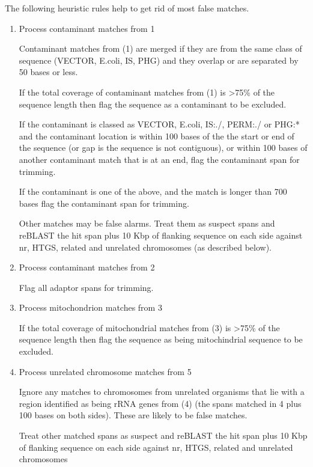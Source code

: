 \documentclass[11pt]{article}
\begin{document}
The following heuristic rules help to get rid of most false matches.

\begin{enumerate}
\item Process contaminant matches from 1
\label{sec:org173af48}


Contaminant matches from (1) are merged if they are from the same class
of sequence (VECTOR, E.coli, IS, PHG) and they overlap or are separated
by 50 bases or less.

If the total coverage of contaminant matches from (1) is >75\% of the
sequence length then flag the sequence as a contaminant to be excluded.

If the contaminant is classed as VECTOR, E.coli, IS:./, PERM:./ or PHG:*
and the contaminant location is within 100 bases of the the start or end
of the sequence (or gap is the sequence is not contiguous), or within
100 bases of another contaminant match that is at an end, flag the
contaminant span for trimming.

If the contaminant is one of the above, and the match is longer than 700
bases flag the contaminant span for trimming.

Other matches may be false alarms. Treat them as suspect spans and
reBLAST the hit span plus 10 Kbp of flanking sequence on each side
against nr, HTGS, related and unrelated chromosomes (as described
below).

\item Process contaminant matches from 2
\label{sec:orgb028152}


Flag all adaptor spans for trimming.

\item Process mitochondrion matches from 3
\label{sec:orgdbfb6b7}


If the total coverage of mitochondrial matches from (3) is >75\% of the
sequence length then flag the sequence as being mitochindrial sequence
to be excluded.

\item Process unrelated chromosome matches from 5
\label{sec:org0f9ea0d}


Ignore any matches to chromosomes from unrelated organisms that lie with
a region identified as being rRNA genes from (4) (the spans matched in 4
plus 100 bases on both sides). These are likely to be false matches.

Treat other matched spans as suspect and reBLAST the hit span plus 10
Kbp of flanking sequence on each side against nr, HTGS, related and
unrelated chromosomes


\end{enumerate}
\end{document}

